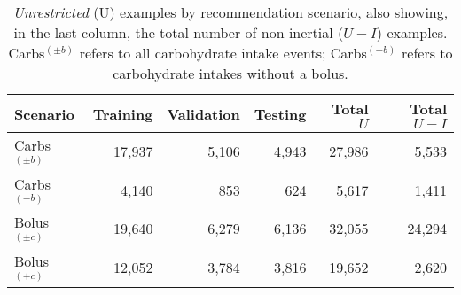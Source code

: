 \begin{table}[ht]
\begin{center}
\begin{tabular}{|l|rrrr|rrrr|}
    \hline
    
\end{tabular}
\end{center}
\end{table}

\begin{table}[ht]\setlength{\tabcolsep}{4pt}
\begin{center}
\caption{{\it Unrestricted} (U) examples by recommendation scenario,  also showing, in the last column, the total number of non-inertial ($U - I$) examples. Carbs$^{(\pm b)}$ refers to all carbohydrate intake events; Carbs$^{(-b)}$ refers to carbohydrate intakes without a bolus.}
\label{tab:c2_examples}
\small
\begin{tabular}{|l|rrrr|r|}
	\hline
	Scenario & Training & Validation & Testing & Total $U$ & Total $U - I$\\
	\hline
	Carbs$^{(\pm b)}$ & 17,937 & 5,106 & 4,943 & 27,986 & 5,533\\
	Carbs$^{(-b)}$  & 4,140 & 853 & 624 & 5,617 & 1,411\\
	Bolus$^{(\pm c)}$ & 19,640 & 6,279 & 6,136 & 32,055 & 24,294\\
	Bolus$^{(+c)}$ & 12,052 & 3,784 & 3,816 & 19,652 & 2,620\\
	\hline
\end{tabular}
\end{center}
\end{table}

